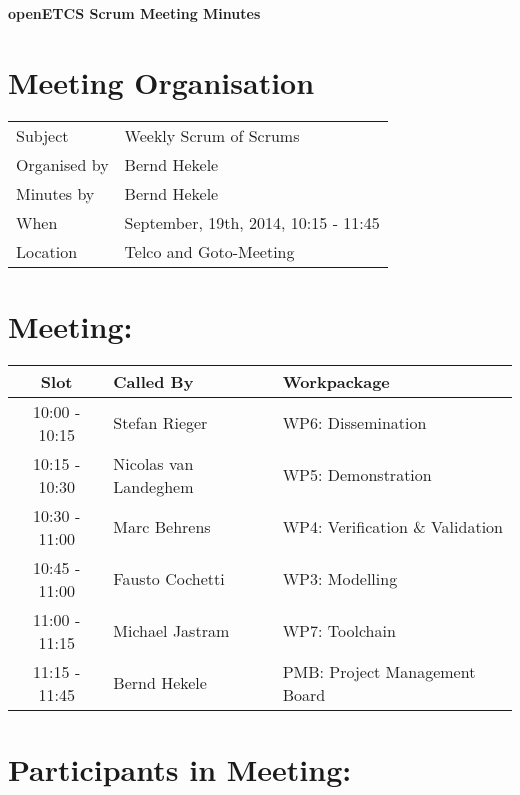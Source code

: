 \documentclass[a4paper, 11pt]{article}
\begin{document}
{\begin{center}\huge\bf openETCS Scrum Meeting Minutes\end{center}}
\section{Meeting Organisation}

\renewcommand{\arraystretch}{1.5}
\begin{supertabular}{m{.2\textwidth}m{.8\textwidth}}
Subject & Weekly Scrum of Scrums\\
Organised by &Bernd Hekele\\
Minutes by & Bernd Hekele\\
When & September, 19th, 2014, 10:15 - 11:45\\
Location & Telco and Goto-Meeting\\
\end{supertabular}

\renewcommand{\arraystretch}{1.0}
\section{Meeting:}

\begin{tabular}{|c|l|l|}
\hline
\textbf{Slot} &  \textbf{Called By} & \textbf{Workpackage} \\
\hline  
10:00 - 10:15 & Stefan Rieger & WP6: Dissemination \\\hline  
10:15 - 10:30 & Nicolas van Landeghem & WP5: Demonstration \\\hline  
10:30 - 11:00 & Marc Behrens & WP4: Verification \& Validation \\\hline  
10:45 - 11:00 & Fausto Cochetti & WP3: Modelling \\\hline  
11:00 - 11:15 & Michael Jastram & WP7: Toolchain \\\hline
11:15 - 11:45 & Bernd Hekele & PMB: Project Management Board \\\hline  
\end{tabular}

\section{Participants in Meeting:}
\end{document}
